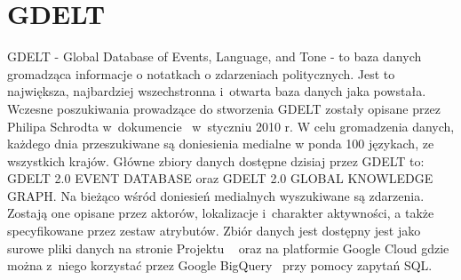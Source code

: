 \documentclass[11pt]{report}
\begin{document}
    \section{GDELT}\label{sec:gdelt}
    GDELT - Global Database of Events, Language, and Tone - to baza danych gromadząca informacje o notatkach o zdarzeniach politycznych.
    Jest to największa, najbardziej wszechstronna i~otwarta baza danych jaka powstała.
    Wczesne poszukiwania prowadzące do stworzenia GDELT zostały opisane przez Philipa Schrodta w~dokumencie~\cite{Schrodt2010} w~styczniu 2010 r.
    W celu gromadzenia danych, każdego dnia przeszukiwane są doniesienia medialne w ponda 100 językach, ze wszystkich krajów.
    Główne zbiory danych dostępne dzisiaj przez GDELT to:
    GDELT 2.0 EVENT DATABASE oraz
    GDELT 2.0 GLOBAL KNOWLEDGE GRAPH\@.
    Na bieżąco wśród doniesień medialnych wyszukiwane są zdarzenia.
    Zostają one opisane przez aktorów, lokalizacje i~charakter aktywności, a także specyfikowane przez zestaw atrybutów.
    Zbiór danych jest dostępny jest jako surowe pliki danych na stronie Projektu ~\cite{gdelt}
    oraz na platformie Google Cloud gdzie można z~niego korzystać przez Google BigQuery~\cite{BigQuery2014} przy pomocy zapytań SQL\@.
\end{document}
